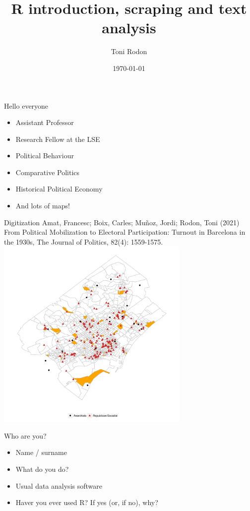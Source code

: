 \documentclass{beamer}
\title{R introduction, scraping and text analysis}
\date{\today}
\author{Toni Rodon}
\institute{Universitat de Barcelona  \\ \faGlobe  \url{www.tonirodon.cat} \\ \faTwitter \href{https://twitter.com/tonirodon}{@tonirodon} }
\begin{document}
  \maketitle


\begin{frame}{Hello everyone}
\begin{itemize}[<+->]
\item Assistant Professor
\item Research Fellow at the LSE
\item Political Behaviour
\item Comparative Politics
\item Historical Political Economy
\item And lots of maps!
 \end{itemize} 
\end{frame}



 \begin{frame}{Digitization}
  \tiny Amat, Francesc; Boix, Carles; Muñoz, Jordi; Rodon, Toni (2021) From Political Mobilization to Electoral Participation: Turnout in Barcelona in the 1930s, The Journal of Politics, 82(4): 1559-1575. 
  \centering
 \includegraphics[width=0.7\textwidth]{../Figures/bcn_jop.pdf}
 \end{frame}


\begin{frame}{Who are you?}
\begin{itemize}
\item Name / surname
\item What do you do?
\item Usual data analysis software
\item Haver you ever used R? If yes (or, if no), why? 
 \end{itemize} 
\end{frame}
\end{document}
